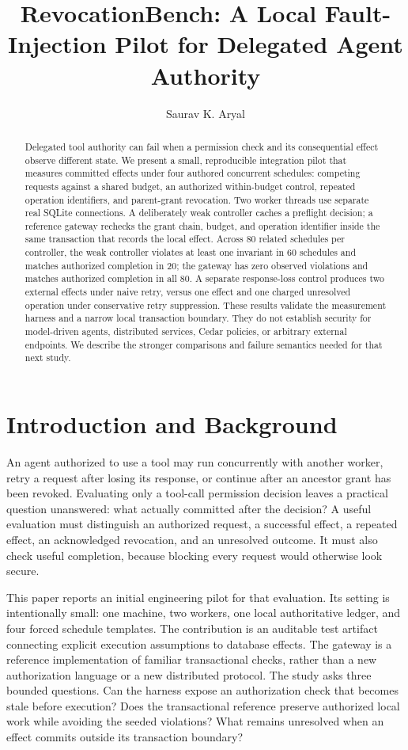 \documentclass[manuscript,screen,nonacm]{acmart}
\title{RevocationBench: A Local Fault-Injection Pilot for Delegated Agent Authority}
\author{Saurav K. Aryal}
\affiliation{\institution{Howard University}\city{Washington, DC}\country{USA}}
\begin{document}
\begin{abstract}
Delegated tool authority can fail when a permission check and its consequential effect observe different state. We present a small, reproducible integration pilot that measures committed effects under four authored concurrent schedules: competing requests against a shared budget, an authorized within-budget control, repeated operation identifiers, and parent-grant revocation. Two worker threads use separate real SQLite connections. A deliberately weak controller caches a preflight decision; a reference gateway rechecks the grant chain, budget, and operation identifier inside the same transaction that records the local effect. Across 80 related schedules per controller, the weak controller violates at least one invariant in 60 schedules and matches authorized completion in 20; the gateway has zero observed violations and matches authorized completion in all 80. A separate response-loss control produces two external effects under naive retry, versus one effect and one charged unresolved operation under conservative retry suppression. These results validate the measurement harness and a narrow local transaction boundary. They do not establish security for model-driven agents, distributed services, Cedar policies, or arbitrary external endpoints. We describe the stronger comparisons and failure semantics needed for that next study.
\end{abstract}
\maketitle

\section{Introduction and Background}
An agent authorized to use a tool may run concurrently with another worker, retry a request after losing its response, or continue after an ancestor grant has been revoked. Evaluating only a tool-call permission decision leaves a practical question unanswered: what actually committed after the decision? A useful evaluation must distinguish an authorized request, a successful effect, a repeated effect, an acknowledged revocation, and an unresolved outcome. It must also check useful completion, because blocking every request would otherwise look secure.

This paper reports an initial engineering pilot for that evaluation. Its setting is intentionally small: one machine, two workers, one local authoritative ledger, and four forced schedule templates. The contribution is an auditable test artifact connecting explicit execution assumptions to database effects. The gateway is a reference implementation of familiar transactional checks, rather than a new authorization language or a new distributed protocol. The study asks three bounded questions. Can the harness expose an authorization check that becomes stale before execution? Does the transactional reference preserve authorized local work while avoiding the seeded violations? What remains unresolved when an effect commits outside its transaction boundary?
\end{document}
